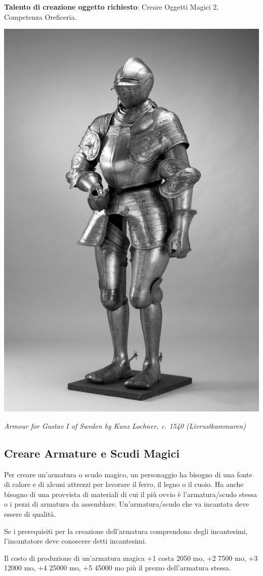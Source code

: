 \begin{multicols}{2}
\medskip

\textbf{Talento di creazione oggetto richiesto}: Creare Oggetti Magici 2, Competenza Oreficeria.


\begin{center}
	\includegraphics[width=0.55\linewidth]{immagini/Rustning_Gustav_Vasa.png}
	
	\emph{Armour for Gustav I of Sweden by Kunz Lochner, c. 1540 (Livrustkammaren)}
\end{center}

\subsection{Creare Armature e Scudi Magici}\label{crearearmaturemagiche}

Per creare un'armatura o scudo magico, un personaggio ha bisogno di una fonte di calore e di alcuni attrezzi per lavorare il ferro, il legno o il cuoio. Ha anche bisogno di una provvista di materiali di cui il più ovvio è l'armatura/scudo stessa o i pezzi di armatura da assemblare. Un'armatura/scudo che va incantata deve essere di qualità.


Se i prerequisiti per la creazione dell'armatura comprendono degli incantesimi, l'incantatore deve conoscere detti incantesimi.

Il costo di produzione di un'armatura magica +1 costa 2050 mo, +2 7500 mo, +3 12000 mo, +4 25000 mo, +5 45000 mo più il prezzo dell'armatura stessa.


\end{multicols}
